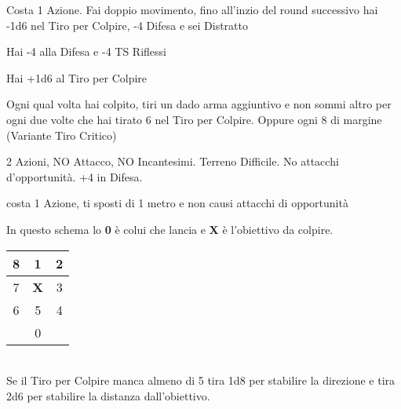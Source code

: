 \documentclass[landscape,10pt,a4paper]{article}
\begin{document}
\begin{multicols}{3}
\begin{dmbox}[title=Azione di Scatto - pagina \pageref{azionediscatto}]
Costa 1 Azione. Fai doppio movimento, fino all'inzio del round successivo hai -1d6 nel Tiro per Colpire, -4 Difesa e sei Distratto
\end{dmbox}

\begin{dmbox}[title=Difesa da Sorpresi - pagina \pageref{difesasorpresi}]
Hai -4 alla Difesa e -4 TS Riflessi
\end{dmbox}

\begin{dmbox}[title=Attacco a Tocco - pagina \pageref{difesaatocco}]
Hai +1d6 al Tiro per Colpire
\end{dmbox}

\begin{dmbox}[title=Tiro Critico - pagina \pageref{tirocritico}]
Ogni qual volta hai colpito, tiri un dado arma aggiuntivo e non sommi altro per ogni due volte che hai tirato 6 nel Tiro per Colpire. Oppure ogni 8 di margine (Variante Tiro Critico)
\end{dmbox}

\begin{dmbox}[title=Difesa Totale - pagina \pageref{difesatotale}]
2 Azioni, NO Attacco, NO Incantesimi. Terreno Difficile. No attacchi d'opportunità. +4 in Difesa.
\end{dmbox}

\begin{dmbox}[title=Disingaggiare - pagina \pageref{disingaggiare}]
costa 1 Azione, ti sposti di 1 metro e non causi attacchi di opportunità
\end{dmbox}

\begin{dmbox}[title=Armi a spargimento - pagina \pageref{attacchiarmidaspargimento}]
In questo schema lo \textbf{0} è colui che lancia e \textbf{X} è l'obiettivo da colpire.\\

\noindent\begin{tabular}{c|c|c}
8 &1 &2\\
\hline
7 &\textbf{X}& 3\\
\hline
6 &5& 4\\
\hline
&0&\\
\end{tabular}\\

Se il Tiro per Colpire manca almeno di 5 tira 1d8 per stabilire la direzione e tira 2d6 per stabilire la distanza dall'obiettivo.
\end{dmbox}


\end{multicols}
\end{document}
